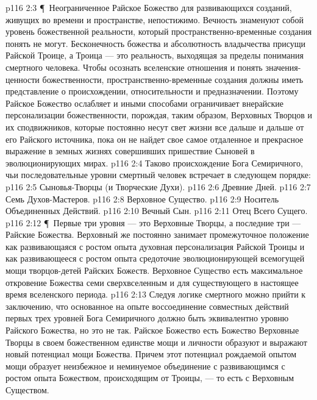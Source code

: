 \vs p116 2:3 \P\ Неограниченное Райское Божество для развивающихся созданий, живущих во времени и пространстве, непостижимо. Вечность знаменуют собой уровень божественной реальности, который пространственно\hyp{}временные создания понять не могут. Бесконечность божества и абсолютность владычества присущи Райской Троице, а Троица --- это реальность, выходящая за пределы понимания смертного человека. Чтобы осознать вселенские отношения и понять значения\hyp{}ценности божественности, пространственно\hyp{}временные создания должны иметь представление о происхождении, относительности и предназначении. Поэтому Райское Божество ослабляет и иными способами ограничивает внерайские персонализации божественности, порождая, таким образом, Верховных Творцов и их сподвижников, которые постоянно несут свет жизни все дальше и дальше от его Райского источника, пока он не найдет свое самое отдаленное и прекрасное выражение в земных жизнях совершивших пришествие Сыновей в эволюционирующих мирах.
\vs p116 2:4 Таково происхождение Бога Семиричного, чьи последовательные уровни смертный человек встречает в следующем порядке:
\vs p116 2:5 \bibnobreakspace Сыновья\hyp{}Творцы (и Творческие Духи).
\vs p116 2:6 \bibnobreakspace Древние Дней.
\vs p116 2:7 \bibnobreakspace Семь Духов\hyp{}Мастеров.
\vs p116 2:8 \bibnobreakspace Верховное Существо.
\vs p116 2:9 \bibnobreakspace Носитель Объединенных Действий.
\vs p116 2:10 \bibnobreakspace Вечный Сын.
\vs p116 2:11 \bibnobreakspace Отец Всего Сущего.
\vs p116 2:12 \P\ Первые три уровня --- это Верховные Творцы, а последние три --- Райские Божества. Верховный же постоянно занимает промежуточное положение как развивающаяся с ростом опыта духовная персонализация Райской Троицы и как развивающееся с ростом опыта средоточие эволюционирующей всемогущей мощи творцов\hyp{}детей Райских Божеств. Верховное Существо есть максимальное откровение Божества семи сверхвселенным и для существующего в настоящее время вселенского периода.
\vs p116 2:13 Следуя логике смертного можно прийти к заключению, что основанное на опыте воссоединение совместных действий первых трех уровней Бога Семиричного должно быть эквивалентно уровню Райского Божества, но это не так. Райское Божество есть Божество  Верховные Творцы в своем божественном единстве мощи и личности образуют и выражают новый потенциал мощи  Божества. Причем этот потенциал рождаемой опытом мощи образует неизбежное и неминуемое объединение с развивающимся с ростом опыта Божеством, происходящим от Троицы, --- то есть с Верховным Существом.
